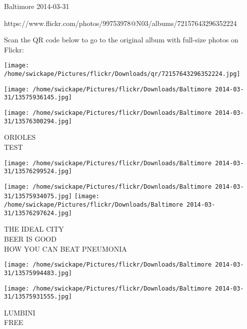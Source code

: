 \documentclass[10pt,letterpaper]{article}
\begin{document}
Baltimore 2014-03-31

https://www.flickr.com/photos/99753978@N03/albums/72157643296352224

Scan the QR code below to go to the original album with full-size photos on Flickr:

\texttt{[image: /home/swickape/Pictures/flickr/Downloads/qr/72157643296352224.jpg]}
\pagebreak

\texttt{[image: /home/swickape/Pictures/flickr/Downloads/Baltimore 2014-03-31/13575936145.jpg]}

\vspace{0.25in}
\texttt{[image: /home/swickape/Pictures/flickr/Downloads/Baltimore 2014-03-31/13576300294.jpg]}

ORIOLES\\
TEST
\pagebreak

\texttt{[image: /home/swickape/Pictures/flickr/Downloads/Baltimore 2014-03-31/13576299524.jpg]}

\vspace{0.25in}
\texttt{[image: /home/swickape/Pictures/flickr/Downloads/Baltimore 2014-03-31/13575934075.jpg]}
\texttt{[image: /home/swickape/Pictures/flickr/Downloads/Baltimore 2014-03-31/13576297624.jpg]}

THE IDEAL CITY\\
BEER IS GOOD\\
HOW YOU CAN BEAT PNEUMONIA
\pagebreak

\texttt{[image: /home/swickape/Pictures/flickr/Downloads/Baltimore 2014-03-31/13575994483.jpg]}

\vspace{0.25in}
\texttt{[image: /home/swickape/Pictures/flickr/Downloads/Baltimore 2014-03-31/13575931555.jpg]}

LUMBINI\\
FREE
\pagebreak
\end{document}
